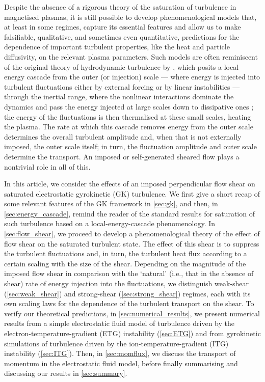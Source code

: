 \documentclass{jpp}
\begin{document}
Despite the absence of a rigorous theory of the saturation of turbulence in magnetised plasmas, it is still possible to develop phenomenological models that, at least in some regimes, capture its essential features and allow us to make falsifiable, qualitative, and sometimes even quantitative, predictions for the dependence of important turbulent properties, like the heat and particle diffusivity, on the relevant plasma parameters. Such models are often reminiscent of the original theory of hydrodynamic turbulence by \citet{K41}, which posits a local energy cascade from the outer (or injection) scale --- where energy is injected into turbulent fluctuations either by external forcing or by linear instabilities --- through the inertial range, where the nonlinear interactions dominate the dynamics and pass the energy injected at large scales down to dissipative ones \citep{GS95,sch09,barnes11,nazarenko11,adkins22,adkins23}; the energy of the fluctuations is then thermalised at these small scales, heating the plasma. The rate at which this cascade removes energy from the outer scale determines the overall turbulent amplitude and, when that is not externally imposed, the outer scale itself; in turn, the fluctuation amplitude and outer scale determine the transport. An imposed or self-generated sheared flow plays a nontrivial role in all of this.

In this article, we consider the effects of an imposed perpendicular flow shear on saturated electrostatic gyrokinetic (GK) turbulence. We first give a short recap of some relevant features of the GK framework in \cref{sec:gk}, and then, in \cref{sec:energy_cascade}, remind the reader of the standard results for saturation of such turbulence based on a local-energy-cascade phenomenology. In \cref{sec:flow_shear}, we proceed to develop a phenomenological theory of the effect of flow shear on the saturated turbulent state. The effect of this shear is to suppress the turbulent fluctuations and, in turn, the turbulent heat flux according to a certain scaling with the size of the shear. Depending on the magnitude of the imposed flow shear in comparison with the `natural' (i.e., that in the absence of shear) rate of energy injection into the fluctuations, we distinguish weak-shear (\cref{sec:weak_shear}) and strong-shear (\cref{sec:strong_shear}) regimes, each with its own scaling laws for the dependence of the turbulent transport on the shear. To verify our theoretical predictions, in \cref{sec:numerical_results}, we present numerical results from a simple electrostatic fluid model of turbulence driven by the electron-temperature-gradient (ETG) instability (\cref{sec:ETG}) and from gyrokinetic simulations of turbulence driven by the ion-temperature-gradient (ITG) instability (\cref{sec:ITG}). Then, in \cref{sec:momflux}, we discuss the transport of momentum in the electrostatic fluid model, before finally summarising and discussing our results in \cref{sec:summary}.
\end{document}
